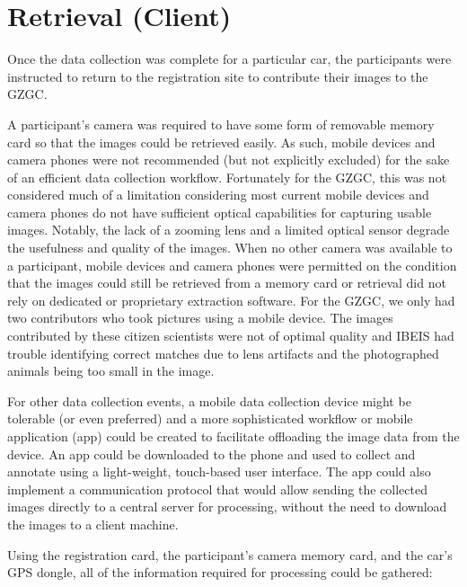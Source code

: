 \section{Retrieval (Client)} \label{sec:retrieval}
Once the data collection was complete for a particular car, the participants were instructed to return to the registration site to contribute their images to the GZGC.

A participant's camera was required to have some form of removable memory card so that the images could be retrieved easily.  As such, mobile devices and camera phones were not recommended (but not explicitly excluded) for the sake of an efficient data collection workflow.  Fortunately for the GZGC, this was not considered much of a limitation considering most current mobile devices and camera phones do not have sufficient optical capabilities for capturing usable images.   Notably, the lack of a zooming lens and a limited optical sensor degrade the usefulness and quality of the images.  When no other camera was available to a participant, mobile devices and camera phones were permitted on the condition that the images could still be retrieved from a memory card or retrieval did not rely on dedicated or proprietary extraction software.  For the GZGC, we only had two contributors who took pictures using a mobile device.  The images contributed by these citizen scientists were not of optimal quality and IBEIS had trouble identifying correct matches due to lens artifacts and the photographed animals being too small in the image.

For other data collection events, a mobile data collection device might be tolerable (or even preferred) and a more sophisticated workflow or mobile application (app) could be created to facilitate offloading the image data from the device.  An app could be downloaded to the phone and used to collect and annotate using a light-weight, touch-based user interface.  The app could also implement a communication protocol that would allow sending the collected images directly to a central server for processing, without the need to download the images to a client machine.

Using the registration card, the participant's camera memory card, and the car's GPS dongle, all of the information required for processing could be gathered:

